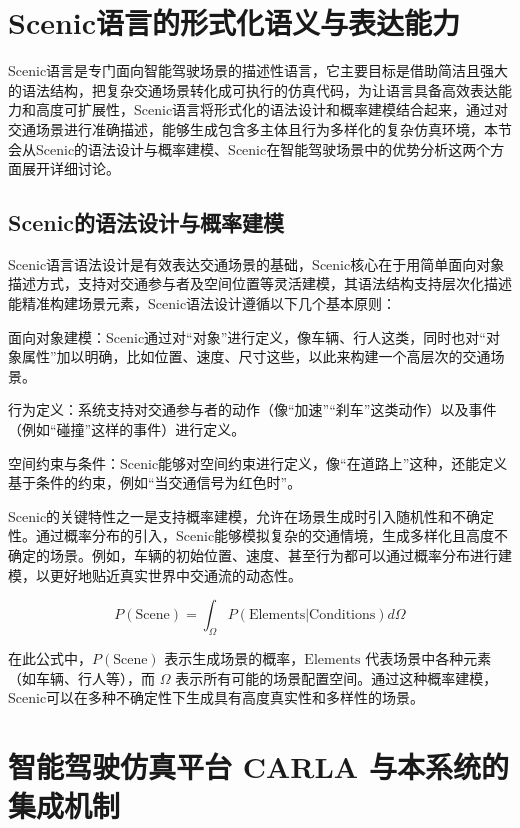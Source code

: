\section{Scenic语言的形式化语义与表达能力}

Scenic语言是专门面向智能驾驶场景的描述性语言，它主要目标是借助简洁且强大的语法结构，把复杂交通场景转化成可执行的仿真代码，为让语言具备高效表达能力和高度可扩展性，Scenic语言将形式化的语法设计和概率建模结合起来，通过对交通场景进行准确描述，能够生成包含多主体且行为多样化的复杂仿真环境，本节会从Scenic的语法设计与概率建模、Scenic在智能驾驶场景中的优势分析这两个方面展开详细讨论。

\subsection{Scenic的语法设计与概率建模}

Scenic语言语法设计是有效表达交通场景的基础，Scenic核心在于用简单面向对象描述方式，支持对交通参与者及空间位置等灵活建模，其语法结构支持层次化描述能精准构建场景元素，Scenic语法设计遵循以下几个基本原则：


面向对象建模：Scenic通过对“对象”进行定义，像车辆、行人这类，同时也对“对象属性”加以明确，比如位置、速度、尺寸这些，以此来构建一个高层次的交通场景。

行为定义：系统支持对交通参与者的动作（像“加速”“刹车”这类动作）以及事件（例如“碰撞”这样的事件）进行定义。

空间约束与条件：Scenic能够对空间约束进行定义，像“在道路上”这种，还能定义基于条件的约束，例如“当交通信号为红色时”。


Scenic的关键特性之一是支持概率建模，允许在场景生成时引入随机性和不确定性。通过概率分布的引入，Scenic能够模拟复杂的交通情境，生成多样化且高度不确定的场景。例如，车辆的初始位置、速度、甚至行为都可以通过概率分布进行建模，以更好地贴近真实世界中交通流的动态性。

\begin{equation}
	P(\text{Scene}) = \int_{\Omega} P(\text{Elements} | \text{Conditions}) d\Omega
\end{equation}

在此公式中，$P(\text{Scene})$ 表示生成场景的概率，$\text{Elements}$ 代表场景中各种元素（如车辆、行人等），而 $\Omega$ 表示所有可能的场景配置空间。通过这种概率建模，Scenic可以在多种不确定性下生成具有高度真实性和多样性的场景。


\section{智能驾驶仿真平台 CARLA 与本系统的集成机制}


